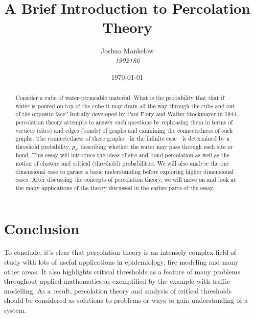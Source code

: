 \documentclass[a4paper,11pt]{article}
\title{\textbf{ A Brief Introduction to Percolation Theory }}
\author{Joshua Mankelow \\ \textit{1902186}}
\date{\today}
\theoremstyle{plain} %
\theoremstyle{definition} %
\theoremstyle{remark} %
\begin{document}
  
\maketitle


\begin{abstract}
  Consider a cube of water-permeable material. What is the probability that that if water is poured on top of the cube it may drain all the way through
  the cube and out of the opposite face? 
  Initially developed by Paul Flory and Walter Stockmayer in 1944, percolation theory attempts to answer such questions by rephrasing them
  in terms of vertices (sites) and edges (bonds) of graphs and examining the connectedness of such graphs. The connectedness of these graphs---in the infinite case---is
  determined by a threshold probability, $p_c$, describing whether the water may pass through each site or bond.
  This essay will introduce the ideas of site and bond percolation as well as the notion of clusters and critical (threshold) probabilities.
  We will also analyse the one dimensional case to garner a basic understanding before exploring higher dimensional cases. After discussing the concepts of percolation theory, we will move on and look at the many applications of the
  theory discussed in the earlier parts of the essay.
\end{abstract}

\newpage

\tableofcontents

\newpage







\section{Conclusion}
To conclude, it's clear that percolation theory is an intensely complex field of study with lots of useful applications in epidemiology, fire modeling and many other areas. It also highlights critical thresholds as a 
feature of many problems throughout applied mathematics as exemplified by the example with traffic modelling. \cite{Li} As a result, percolation theory and analysis of critical thresholds should be considered as solutions to problems or ways
to gain understanding of a system.

\newpage



\end{document}

